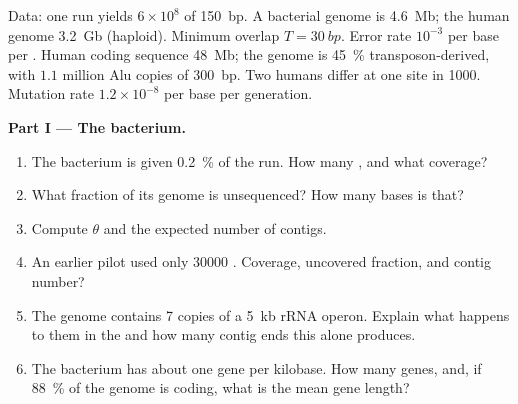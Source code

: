 \begin{problem}
\label{pb:b3:genomics:1}
Data: one run yields $6\times 10^{8}$  of \qty{150}{bp}. A
bacterial genome is \qty{4.6}{Mb}; the human genome \qty{3.2}{Gb}
(haploid). Minimum overlap $T = \qty{30}{bp}$. Error rate $10^{-3}$
per base per . Human coding sequence \qty{48}{Mb}; the genome is
\qty{45}{\%} transposon-derived, with $1.1$ million Alu copies of
\qty{300}{bp}. Two humans differ at one site in \num{1000}. Mutation
rate $1.2\times 10^{-8}$ per base per generation.

\medskip
\noindent\textbf{Part I --- The bacterium.}
\begin{enumerate}
  \item The bacterium is given \qty{0.2}{\%} of the run. How many
        , and what coverage?
  \item What fraction of its genome is unsequenced? How many bases is
        that?
  \item Compute $\theta$ and the expected number of contigs.
  \item An earlier pilot used only \num{30000} . Coverage,
        uncovered fraction, and contig number?
  \item The genome contains \num{7} copies of a \qty{5}{kb} rRNA
        operon. Explain what happens to them in the  and how
        many contig ends this alone produces.
  \item The bacterium has about one gene per kilobase. How many genes,
        and, if \qty{88}{\%} of the genome is coding, what is the mean
        gene length?
\end{enumerate}


\end{problem}
